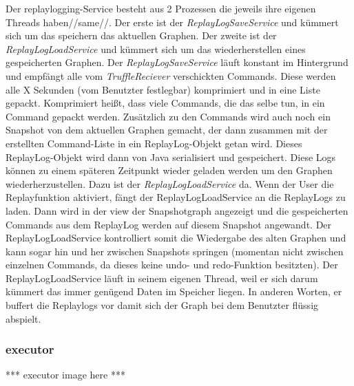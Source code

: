     Der replaylogging-Service besteht aus 2 Prozessen die jeweils ihre eigenen Threads haben//same//.
    Der erste ist der \textit{ReplayLogSaveService} und kümmert sich um das speichern das aktuellen
    Graphen. Der zweite ist der \textit{ReplayLogLoadService} und kümmert sich um das
    wiederherstellen eines gespeicherten Graphen.
    \newline
    \newline
    Der \textit{ReplayLogSaveService} läuft konstant im Hintergrund und empfängt alle
    vom \textit{TruffleReciever} verschickten Commands. Diese werden alle X
    Sekunden (vom Benutzter festlegbar) komprimiert und in eine Liste gepackt.
    Komprimiert heißt, dass viele Commands, die das selbe tun, in ein Command
    gepackt werden. Zusätzlich zu den Commands wird auch noch ein Snapshot
    von dem aktuellen Graphen gemacht, der dann zusammen mit der erstellten
    Command-Liste in ein ReplayLog-Objekt getan wird. Dieses
    ReplayLog-Objekt wird dann von Java serialisiert und gespeichert.
    \newline
    \newline
    Diese Logs können zu einem späteren Zeitpunkt wieder geladen werden um den
    Graphen wiederherzustellen. Dazu ist der \textit{ReplayLogLoadService} da. Wenn
    der User die Replayfunktion aktiviert, fängt der ReplayLogLoadService an die
    ReplayLogs zu laden. Dann wird in der view der Snapshotgraph angezeigt
    und die gespeicherten Commands aus dem ReplayLog werden auf
    diesem Snapshot angewandt. Der ReplayLogLoadService kontrolliert somit die
    Wiedergabe des alten Graphen und kann sogar hin und her zwischen Snapshots
    springen (momentan nicht zwischen einzelnen Commands, da dieses keine undo-
    und redo-Funktion besitzten).
    \newline
    \newline
    Der ReplayLogLoadService läuft in seinem eigenen Thread, weil er sich darum
    kümmert das immer genügend Daten im Speicher liegen. In anderen Worten, er
    buffert die Replaylogs vor damit sich der Graph bei dem Benutzter flüssig
    abspielt.

    \subsubsection{executor}
    \label{subsubsec:executor}

    *** executor image here ***
    \newline
    \newline


